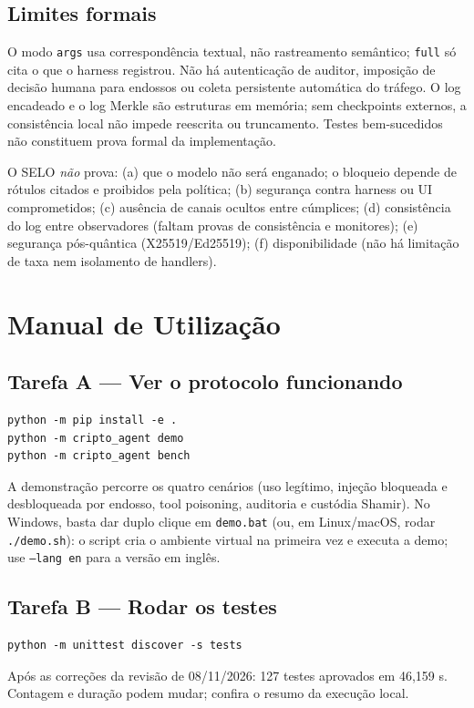 \documentclass[11pt,a4paper]{article}
\theoremstyle{plain}
\theoremstyle{definition}
\theoremstyle{remark}
\newcommand{\cod}[1]{\texttt{#1}}
\begin{document}
\subsection{Limites formais}

O modo \cod{args} usa correspondência textual, não rastreamento semântico; \cod{full} só cita o que o harness registrou. Não há autenticação de auditor, imposição de decisão humana para endossos ou coleta persistente automática do tráfego. O log encadeado e o log Merkle são estruturas em memória; sem checkpoints externos, a consistência local não impede reescrita ou truncamento. Testes bem-sucedidos não constituem prova formal da implementação.

O SELO \emph{não} prova: (a) que o modelo não será enganado; o bloqueio depende de rótulos citados e proibidos pela política; (b) segurança contra harness ou UI comprometidos; (c) ausência de canais ocultos entre cúmplices; (d) consistência do log entre observadores (faltam provas de consistência e monitores); (e) segurança pós-quântica (X25519/Ed25519); (f) disponibilidade (não há limitação de taxa nem isolamento de handlers).

\section{Manual de Utilização}

\subsection*{Tarefa A --- Ver o protocolo funcionando}
\begin{lstlisting}
python -m pip install -e .
python -m cripto_agent demo
python -m cripto_agent bench
\end{lstlisting}
A demonstração percorre os quatro cenários (uso legítimo, injeção bloqueada e desbloqueada por endosso, tool poisoning, auditoria e custódia Shamir). No Windows, basta dar duplo clique em \cod{demo.bat} (ou, em Linux/macOS, rodar \cod{./demo.sh}): o script cria o ambiente virtual na primeira vez e executa a demo; use \cod{--lang en} para a versão em inglês.

\subsection*{Tarefa B --- Rodar os testes}
\begin{lstlisting}
python -m unittest discover -s tests
\end{lstlisting}
Após as correções da revisão de 08/11/2026: 127 testes aprovados em 46,159 s. Contagem e duração podem mudar; confira o resumo da execução local.
\end{document}
